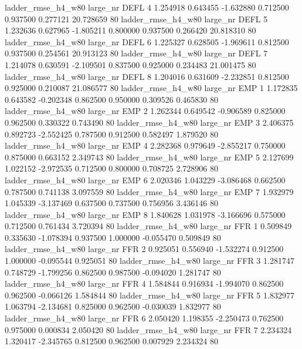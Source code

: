  ladder_rmse_h4_w80   large_nr     DEFL                 4  1.254918  0.643455  -1.632880 0.712500 0.937500  0.277121   20.728659 80
 ladder_rmse_h4_w80   large_nr     DEFL                 5  1.232636  0.627965  -1.805211 0.800000 0.937500  0.266420   20.818310 80
 ladder_rmse_h4_w80   large_nr     DEFL                 6  1.225327  0.628505  -1.969611 0.812500 0.937500  0.254561   20.913123 80
 ladder_rmse_h4_w80   large_nr     DEFL                 7  1.214078  0.630591  -2.109501 0.837500 0.925000  0.234483   21.001475 80
 ladder_rmse_h4_w80   large_nr     DEFL                 8  1.204016  0.631609  -2.232851 0.812500 0.925000  0.210087   21.086577 80
 ladder_rmse_h4_w80   large_nr      EMP                 1  1.172835  0.643582  -0.202348 0.862500 0.950000  0.309526    0.465830 80
 ladder_rmse_h4_w80   large_nr      EMP                 2  1.262344  0.649542  -0.906589 0.825000 0.962500  0.330322    0.743490 80
 ladder_rmse_h4_w80   large_nr      EMP                 3  2.406375  0.892723  -2.552425 0.787500 0.912500  0.582497    1.879520 80
 ladder_rmse_h4_w80   large_nr      EMP                 4  2.282368  0.979649  -2.855217 0.750000 0.875000  0.663152    2.349743 80
 ladder_rmse_h4_w80   large_nr      EMP                 5  2.127699  1.022152  -2.972535 0.712500 0.800000  0.708725    2.728906 80
 ladder_rmse_h4_w80   large_nr      EMP                 6  2.020346  1.043229  -3.086468 0.662500 0.787500  0.741138    3.097559 80
 ladder_rmse_h4_w80   large_nr      EMP                 7  1.932979  1.045339  -3.137469 0.637500 0.737500  0.756956    3.436146 80
 ladder_rmse_h4_w80   large_nr      EMP                 8  1.840628  1.031978  -3.166696 0.575000 0.712500  0.761434    3.720394 80
 ladder_rmse_h4_w80   large_nr      FFR                 1  0.509849  0.335630  -1.078394 0.937500 1.000000 -0.055470    0.509849 80
 ladder_rmse_h4_w80   large_nr      FFR                 2  0.925051  0.556940  -1.532274 0.912500 1.000000 -0.095544    0.925051 80
 ladder_rmse_h4_w80   large_nr      FFR                 3  1.281747  0.748729  -1.799256 0.862500 0.987500 -0.094020    1.281747 80
 ladder_rmse_h4_w80   large_nr      FFR                 4  1.584844  0.916934  -1.994070 0.862500 0.962500 -0.066126    1.584844 80
 ladder_rmse_h4_w80   large_nr      FFR                 5  1.832977  1.063794  -2.134681 0.825000 0.962500 -0.030039    1.832977 80
 ladder_rmse_h4_w80   large_nr      FFR                 6  2.050420  1.198355  -2.250473 0.762500 0.975000  0.000834    2.050420 80
 ladder_rmse_h4_w80   large_nr      FFR                 7  2.234324  1.320417  -2.345765 0.812500 0.962500  0.007929    2.234324 80
